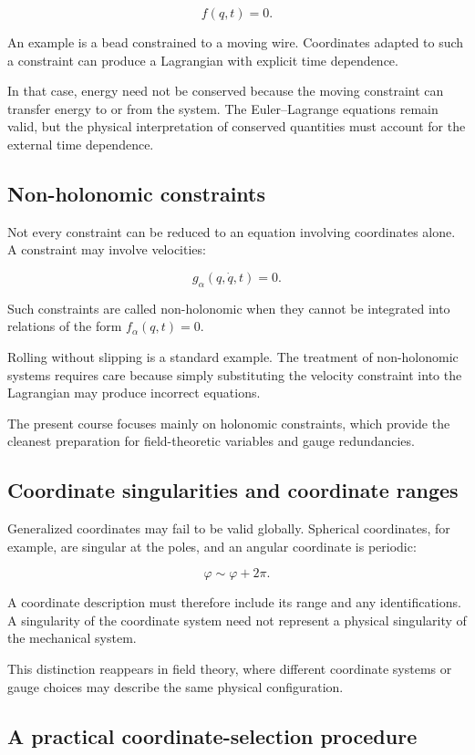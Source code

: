 \[
f(q,t)=0.
\]

An example is a bead constrained to a moving wire. Coordinates adapted to such a constraint can produce a Lagrangian with explicit time dependence.

In that case, energy need not be conserved because the moving constraint can transfer energy to or from the system. The Euler--Lagrange equations remain valid, but the physical interpretation of conserved quantities must account for the external time dependence.

\subsection{Non-holonomic constraints}

Not every constraint can be reduced to an equation involving coordinates alone. A constraint may involve velocities:

\[
g_{\alpha}(q,\dot q,t)=0.
\]

Such constraints are called non-holonomic when they cannot be integrated into relations of the form \(f_{\alpha}(q,t)=0\).

Rolling without slipping is a standard example. The treatment of non-holonomic systems requires care because simply substituting the velocity constraint into the Lagrangian may produce incorrect equations.

The present course focuses mainly on holonomic constraints, which provide the cleanest preparation for field-theoretic variables and gauge redundancies.

\subsection{Coordinate singularities and coordinate ranges}

Generalized coordinates may fail to be valid globally. Spherical coordinates, for example, are singular at the poles, and an angular coordinate is periodic:

\[
\varphi
\sim
\varphi+2\pi.
\]

A coordinate description must therefore include its range and any identifications. A singularity of the coordinate system need not represent a physical singularity of the mechanical system.

This distinction reappears in field theory, where different coordinate systems or gauge choices may describe the same physical configuration.

\subsection{A practical coordinate-selection procedure}

